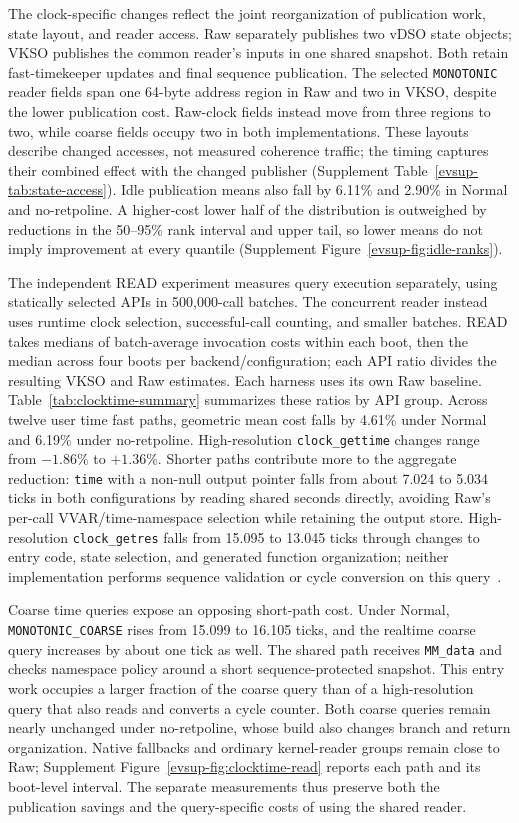 The clock-specific changes reflect the joint reorganization of
publication work, state layout, and reader access. Raw separately
publishes two vDSO state objects; VKSO publishes the common reader's
inputs in one shared snapshot. Both retain fast-timekeeper updates and
final sequence publication. The selected \texttt{MONOTONIC} reader
fields span one 64-byte address region in Raw and two in VKSO, despite
the lower publication cost. Raw-clock fields instead move from three
regions to two, while coarse fields occupy two in both implementations.
These layouts describe changed accesses, not measured coherence traffic;
the timing captures their combined effect with the changed publisher
(Supplement Table~\ref{evsup-tab:state-access}). Idle publication means
also fall by 6.11\% and 2.90\% in Normal and no-retpoline. A higher-cost
lower half of the distribution is outweighed by reductions in the
50--95\% rank interval and upper tail, so lower means do not imply
improvement at every quantile
(Supplement Figure~\ref{evsup-fig:idle-ranks}).

The independent READ experiment measures query execution separately,
using statically selected APIs in 500,000-call batches. The concurrent
reader instead uses runtime clock selection, successful-call counting,
and smaller batches. READ takes medians of batch-average invocation
costs within each boot, then the median across four boots per
backend/configuration; each API ratio divides the resulting VKSO and
Raw estimates. Each harness uses its own Raw baseline.
Table~\ref{tab:clocktime-summary} summarizes these ratios
by API group. Across twelve user time fast paths, geometric mean cost
falls by 4.61\% under Normal and 6.19\% under no-retpoline.
High-resolution \texttt{clock\_gettime} changes range from $-1.86\%$
to $+1.36\%$. Shorter paths contribute more to the aggregate reduction:
\texttt{time} with a non-null output pointer falls from about 7.024 to
5.034 ticks in both configurations by reading shared seconds directly,
avoiding Raw's per-call VVAR/time-namespace selection while retaining
the output store. High-resolution \texttt{clock\_getres} falls from
15.095 to 13.045 ticks through changes to entry code, state selection,
and generated function organization; neither implementation performs
sequence validation or cycle conversion on this
query~\cite{ev_linuxvdso515}.

Coarse time queries expose an opposing short-path cost. Under Normal,
\texttt{MONOTONIC\_COARSE} rises from 15.099 to 16.105 ticks, and the
realtime coarse query increases by about one tick as well. The shared
path receives \texttt{MM\_data} and checks namespace policy around a
short sequence-protected snapshot. This entry work occupies a larger
fraction of the coarse query than of a high-resolution query that also
reads and converts a cycle counter. Both coarse queries remain nearly
unchanged under no-retpoline, whose build also changes branch and return
organization. Native fallbacks and ordinary kernel-reader groups remain
close to Raw; Supplement Figure~\ref{evsup-fig:clocktime-read} reports
each path and its boot-level interval. The separate measurements thus
preserve both the publication savings and the query-specific costs of
using the shared reader.

